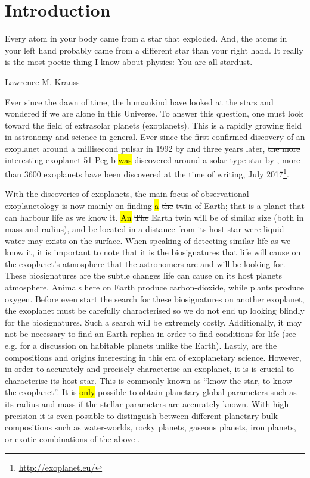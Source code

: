 \chapter{Introduction}
\label{cha:introduction}
\epigraph{Every atom in your body came from a star that exploded. And, the atoms in your left hand
          probably came from a different star than your right hand. It really is the most poetic
          thing I know about physics: You are all stardust.}{Lawrence M. Krauss}

Ever since the dawn of time, the humankind have looked at the stars and wondered if we are alone in
this Universe. To answer this question, one must look toward the field of extrasolar planets
(exoplanets). This is a rapidly growing field in astronomy and science in general. Ever since the
first confirmed discovery of an exoplanet around a millisecond pulsar in 1992 by
\citet{Wolszczan1992} and three years later, \st{the more interesting} exoplanet 51 Peg b \hl{was}
discovered around a solar-type star by \citet{Mayor1995}, more than 3600 exoplanets have been
discovered at the time of writing, July 2017\footnote{\url{http://exoplanet.eu/}}.

With the discoveries of exoplanets, the main focus of observational exoplanetology is now mainly on
finding \hl{a} \st{the} twin of Earth; that is a planet that can harbour life as we know it. \hl{An}
\st{The} Earth twin will be of similar size (both in mass and radius), and be located in a distance
from its host star were liquid water may exists on the surface. When speaking of detecting similar
life as we know it, it is important to note that it is the biosignatures that life will cause on the
exoplanet's atmosphere that the astronomers are and will be looking for. These biosignatures are the
subtle changes life can cause on its host planets atmosphere. Animals here on Earth produce
carbon-dioxide, while plants produce oxygen. Before even start the search for these biosignatures on
another exoplanet, the exoplanet must be carefully characterised so we do not end up looking blindly
for the biosignatures. Such a search will be extremely costly. Additionally, it may not be necessary
to find an Earth replica in order to find conditions for life (see e.g. \citet{Alibert2014} for a
discussion on habitable planets unlike the Earth). Lastly, are the compositions and origins
interesting in this era of exoplanetary science. However, in order to accurately and precisely
characterise an exoplanet, it is is crucial to characterise its host star. This is commonly known as
``know the star, to know the exoplanet''. It is \hl{only} possible to obtain planetary global
parameters such as its radius and mass if the stellar parameters are accurately known. With high
precision it is even possible to distinguish between different planetary bulk compositions such as
water-worlds, rocky planets, gaseous planets, iron planets, or exotic combinations of the above
\citep[see e.g.][]{Dorn2015,Thiabaud2014}.


